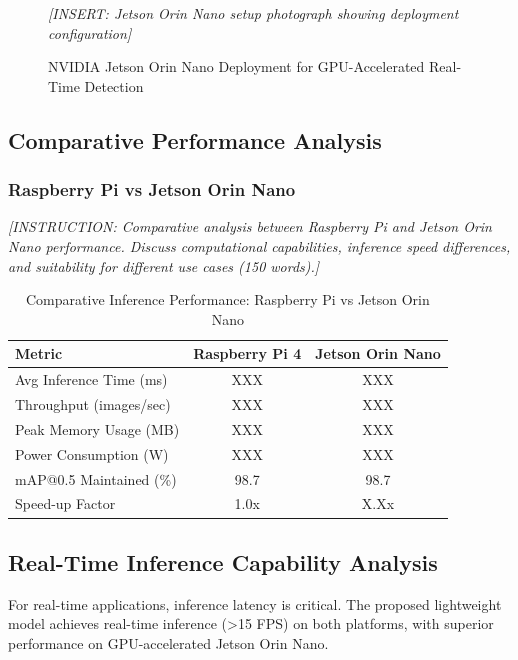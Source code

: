 \documentclass[11pt,a4paper]{article}
\begin{document}
\begin{figure}[H]
    \centering
    \textit{[INSERT: Jetson Orin Nano setup photograph showing deployment configuration]}
    \caption{NVIDIA Jetson Orin Nano Deployment for GPU-Accelerated Real-Time Detection}
    \label{fig:jetson_setup}
\end{figure}

\subsection{Comparative Performance Analysis}

\subsubsection{Raspberry Pi vs Jetson Orin Nano}

\textit{[INSTRUCTION: Comparative analysis between Raspberry Pi and Jetson Orin Nano performance. 
Discuss computational capabilities, inference speed differences, and suitability for different use cases 
(150 words).]}

\begin{table}[H]
    \centering
    \caption{Comparative Inference Performance: Raspberry Pi vs Jetson Orin Nano}
    \label{tab:edge_comparison}
    \begin{tabular}{|l|c|c|}
    \hline
    \textbf{Metric} & \textbf{Raspberry Pi 4} & \textbf{Jetson Orin Nano} \\
    \hline
    Avg Inference Time (ms) & XXX & XXX \\
    Throughput (images/sec) & XXX & XXX \\
    Peak Memory Usage (MB) & XXX & XXX \\
    Power Consumption (W) & XXX & XXX \\
    mAP@0.5 Maintained (\%) & 98.7 & 98.7 \\
    Speed-up Factor & 1.0x & X.Xx \\
    \hline
    \end{tabular}
\end{table}

\subsection{Real-Time Inference Capability Analysis}

For real-time applications, inference latency is critical. The proposed lightweight model achieves 
real-time inference (>15 FPS) on both platforms, with superior performance on GPU-accelerated Jetson Orin Nano.
\end{document}
